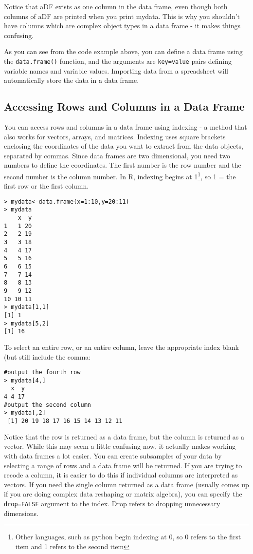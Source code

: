 \documentclass[12pt, oneside]{amsart}   	%
\begin{document}
Notice that aDF exists as one column in the data frame, even though both columns of aDF are printed when you print mydata. This is why you shouldn't have columns which are complex object types in a data frame - it makes things confusing.

As you can see from the code example above, you can define a data frame using the \texttt{data.frame()} function, and the arguments are \texttt{key=value} pairs defining variable names and variable values. Importing data from a spreadsheet will automatically store the data in a data frame. 

\subsection{Accessing Rows and Columns in a Data Frame}

You can access rows and columns in a data frame using indexing - a method that also works for vectors, arrays, and matrices. Indexing uses square brackets enclosing the coordinates of the data you want to extract from the data objects, separated by commas. Since data frames are two dimensional, you need two numbers to define the coordinates. The first number is the row number and the second number is the column number. In R, indexing begins at 1\footnote{Other languages, such as python begin indexing at 0, so 0 refers to the first item and 1 refers to the second item}, so 1 = the first row or the first column. 

\begin{verbatim}
> mydata<-data.frame(x=1:10,y=20:11)
> mydata
    x  y
1   1 20
2   2 19
3   3 18
4   4 17
5   5 16
6   6 15
7   7 14
8   8 13
9   9 12
10 10 11
> mydata[1,1]
[1] 1
> mydata[5,2]
[1] 16
\end{verbatim}

To select an entire row, or an entire column, leave the appropriate index blank (but still include the comma:

\begin{verbatim}
#output the fourth row
> mydata[4,]
  x  y
4 4 17
#output the second column
> mydata[,2]
 [1] 20 19 18 17 16 15 14 13 12 11
\end{verbatim}

Notice that the row is returned as a data frame, but the column is returned as a vector. While this may seem a little confusing now, it actually makes working with data frames a lot easier. You can create subsamples of your data by selecting a range of rows and a data frame will be returned. If you are trying to recode a column, it is easier to do this if individual columns are interpreted as vectors. If you need the single column returned as a data frame (usually comes up if you are doing complex data reshaping or matrix algebra), you can specify the \texttt{drop=FALSE} argument to the index. Drop refers to dropping unnecessary dimensions.
\end{document}
